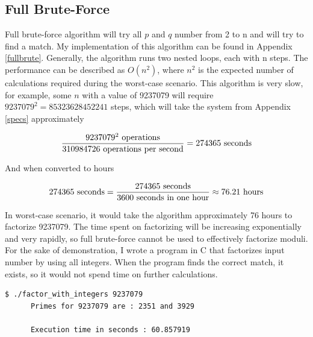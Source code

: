 \documentclass[a4paper, 12pt]{article}
\begin{document}
\subsection{Full Brute-Force}
\label{bsec:full}

Full brute-force algorithm will try all $p$ and $q$ number from 2 to n and will try to find a match. My
implementation of this algorithm can be found in Appendix \ref{fullbrute}. Generally, the algorithm runs two
nested loops, each with n steps. The performance can be described as $O(n^2)$, where $n^2$ is the
expected number of calculations required during the worst-case scenario.
This algorithm is very slow, for example, some $n$ with a value of
9237079 will require $9237079^2 = 85323628452241$ steps, which will take the system from
Appendix \ref{specs} approximately

\begin{equation*}
  \frac{9237079^2 \text{ operations}}{ 310984726 \text{ operations per second}} = 274365 \text{ seconds}\\
  \end{equation*}

And when converted to hours

\begin{equation*}
  274365 \text{ seconds}=\frac{274365 \text{ seconds}}{3600  \text{ seconds in one hour}} \approx 76.21 \text{ hours}\\
  \end{equation*}

In worst-case scenario, it would take the algorithm approximately 76 hours to factorize 9237079. The time spent on factorizing
will be increasing exponentially and very rapidly, so full brute-force cannot be used to effectively factorize
moduli.\\

For the sake of demonstration, I wrote a program in C that factorizes input number by using all integers. When the program
finds the correct match, it exists, so it would not spend time on further calculations.\cite{github}

\begin{center}
\begin{lstlisting}[caption=Demonstartion of Prime Factorization with Integers]
      $ ./factor_with_integers 9237079            
      Primes for 9237079 are : 2351 and 3929

      Execution time in seconds : 60.857919
  \end{lstlisting}
\end{center}
\end{document}
